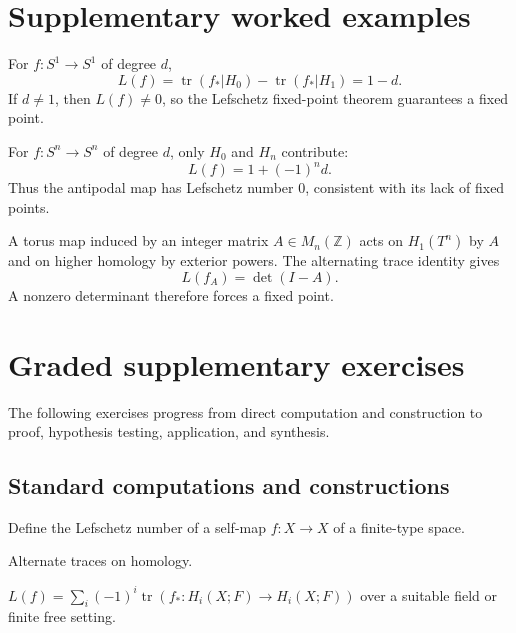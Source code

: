 \section{Supplementary worked examples}
\label{sec:viii35-pedagogy}

\begin{example}\label{ex:viii35-ped-01}
For $f:S^1\to S^1$ of degree $d$,
\[
L(f)=\operatorname{tr}(f_*|H_0)-\operatorname{tr}(f_*|H_1)=1-d.
\]
If $d\ne1$, then $L(f)\ne0$, so the Lefschetz fixed-point theorem guarantees a fixed point.
\end{example}

\begin{example}\label{ex:viii35-ped-02}
For $f:S^n\to S^n$ of degree $d$, only $H_0$ and $H_n$ contribute:
\[
L(f)=1+(-1)^n d.
\]
Thus the antipodal map has Lefschetz number $0$, consistent with its lack of fixed points.
\end{example}

\begin{example}\label{ex:viii35-ped-03}
A torus map induced by an integer matrix $A\in M_n(\mathbb Z)$ acts on $H_1(T^n)$ by $A$ and on higher homology by exterior powers. The alternating trace identity gives
\[
L(f_A)=\det(I-A).
\]
A nonzero determinant therefore forces a fixed point.
\end{example}

\section{Graded supplementary exercises}
The following exercises progress from direct computation and construction to proof, hypothesis testing, application, and synthesis.

\subsection*{Standard computations and constructions}

\begin{exercise}[Definition]\label{exr:viii35-ped-01}
Define the Lefschetz number of a self-map $f:X\to X$ of a finite-type space.
\end{exercise}
\begin{hint}
Alternate traces on homology.
\end{hint}
\begin{solution}
$L(f)=\sum_i(-1)^i\operatorname{tr}(f_*:H_i(X;F)\to H_i(X;F))$ over a suitable field or finite free setting.
\end{solution}

